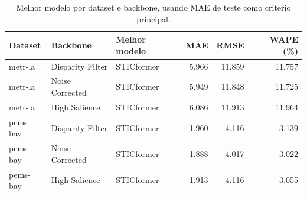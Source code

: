 \begin{table}[ht]
\centering
\caption{Melhor modelo por dataset e backbone, usando MAE de teste como criterio principal.}
\label{tab:best-models-backbones}
\begin{tabular}{lllrrr}
\toprule
Dataset & Backbone & Melhor modelo & MAE & RMSE & WAPE (\%) \\
\midrule
metr-la & Disparity Filter & STICformer & 5.966 & 11.859 & 11.757 \\
metr-la & Noise Corrected & STICformer & 5.949 & 11.848 & 11.725 \\
metr-la & High Salience & STICformer & 6.086 & 11.913 & 11.964 \\
pems-bay & Disparity Filter & STICformer & 1.960 & 4.116 & 3.139 \\
pems-bay & Noise Corrected & STICformer & 1.888 & 4.017 & 3.022 \\
pems-bay & High Salience & STICformer & 1.913 & 4.116 & 3.055 \\
\bottomrule
\end{tabular}
\end{table}
